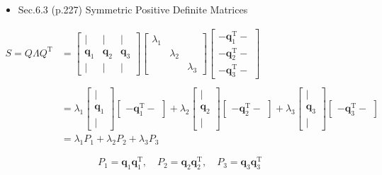 \documentclass[letterpaper]{article}
\DeclareRobustCommand\transp{^{\mathrm{T}}}
\begin{document}
\begin{itemize}
  \item Sec.6.3 (p.227) Symmetric Positive Definite Matrices
\end{itemize}

\begin{align*}
  S = Q \Lambda Q\transp
&= \begin{bmatrix}
    | & | & |\\
    \bm{q}_1 & \bm{q}_2 & \bm{q}_3\\
    | & | & |
  \end{bmatrix}
  \begin{bmatrix}
    \lambda_1 \\
           & \lambda_2 & \\
           & & \lambda_3
  \end{bmatrix}
  \begin{bmatrix}
  - \bm{q}_1\transp -\\
  - \bm{q}_2\transp -\\
  - \bm{q}_3\transp -
  \end{bmatrix}\\
  \\
  &=
  \lambda_1 \begin{bmatrix}
    |\\
    \bm{q}_1\\
    |
  \end{bmatrix}
  \begin{bmatrix}
    - \bm{q}_1\transp - 
  \end{bmatrix}
  +
  \lambda_2 \begin{bmatrix}
  |\\
  \bm{q}_2\\
  |
  \end{bmatrix}
  \begin{bmatrix}
  - \bm{q}_2\transp -
  \end{bmatrix} 
  +
  \lambda_3 \begin{bmatrix}
    |\\
    \bm{q}_3 \\
    |
  \end{bmatrix}
  \begin{bmatrix}
    - \bm{q}_3\transp -
  \end{bmatrix} \\
&= \lambda_1 P_1 + \lambda_2 P_2 + \lambda_3 P_3
\end{align*}

\begin{equation*}
  P_1=\bm{q}_1 \bm{q}_1\transp, \quad P_2=\bm{q}_2 \bm{q}_2\transp, \quad P_3=\bm{q}_3 \bm{q}_3\transp
\end{equation*}
\end{document}
